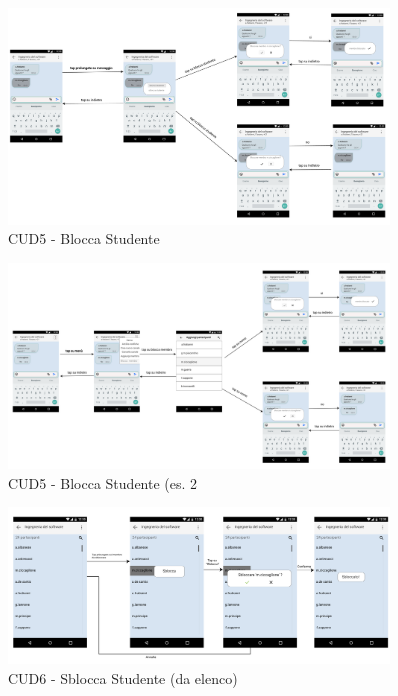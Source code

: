 \begin{figure}
	\centering
	\includegraphics[width=0.9\textwidth]{imgs/gruppo6/activities/act_cud5_blocca_studente.pdf}
	\caption{CUD5 - Blocca Studente}
	\label{fig:act-cud5}
\end{figure}

\begin{figure}
	\centering
	\includegraphics[width=0.9\textwidth]{imgs/gruppo6/activities/act_cud5_blocca_studente2.pdf}
	\caption{CUD5 - Blocca Studente (es. 2}
	\label{fig:act-cud5-2}
\end{figure}

\begin{figure}
	\centering
	\includegraphics[width=0.9\textwidth]{imgs/gruppo6/activities/act_cud6_sblocca_da_elenco.pdf}
	\caption{CUD6 - Sblocca Studente (da elenco)}
	\label{fig:act-cud6}
\end{figure}

